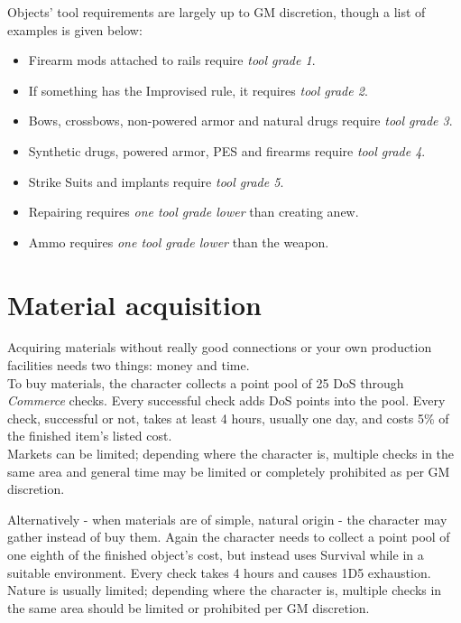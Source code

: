 \documentclass[12pt,a4paper,openany]{book}
\begin{document}
	Objects’ tool requirements are largely up to GM discretion, though a list of examples is given below:
	\begin{itemize}
		\setlength\itemsep{-8mm}
		\item Firearm mods attached to rails require \emph{tool grade 1}.
		\item If something has the Improvised rule, it requires \emph{tool grade 2}.
		\item Bows, crossbows, non-powered armor and natural drugs require \emph{tool grade 3}.
		\item Synthetic drugs, powered armor, PES and firearms require \emph{tool grade 4}.
		\item Strike Suits and implants require \emph{tool grade 5}.
		\item Repairing requires \emph{one tool grade lower} than creating anew.
		\item Ammo requires \emph{one tool grade lower} than the weapon.
	\end{itemize}
	
	\chapter{Material acquisition}
	Acquiring materials without really good connections or your own production facilities needs two things: money and time.\\
	To buy materials, the character collects a point pool of 25 DoS through \emph{Commerce} checks.
	Every successful check adds DoS points into the pool. Every check, successful or not, takes at least 4 hours, usually one day, and costs 5\% of the finished item’s listed cost.\\
	Markets can be limited; depending where the character is, multiple checks in the same area and general time may be limited or completely prohibited as per GM discretion. \par
	Alternatively - when materials are of simple, natural origin - the character may gather instead of buy them.
	Again the character needs to collect a point pool of one eighth of the finished object's cost, but instead uses Survival while in a suitable environment.
	Every check takes 4 hours and causes 1D5 exhaustion.\\
	Nature is usually limited; depending where the character is, multiple checks in the same area should be limited or prohibited per GM discretion.
\end{document}
